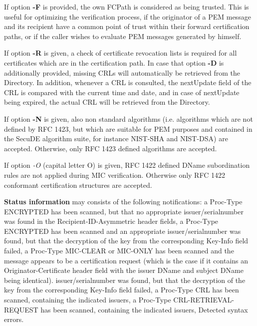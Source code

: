 If option {\bf -F} is provided, the own FCPath is considered as being trusted.
This is useful for optimizing the verification process,
if the originator of a PEM message and its recipient have a common point of trust
within their forward certification paths, or if the caller wishes to evaluate PEM messages
generated by himself.

If option {\bf -R} is given, a check of certificate revocation lists is required for all certificates
which are in the certification path. In case that option {\bf -D} is additionally provided, missing CRLs will
automatically be retrieved from the Directory. In addition, whenever a CRL is consulted, the 
nextUpdate field of the CRL is compared with the current time and date, and in case of nextUpdate
being expired, the actual CRL will be retrieved from the Directory. 

If option {\bf -N}
is given, also non standard algorithms (i.e. algorithms which are not defined by RFC 1423,
but which are suitable for PEM purposes and contained in the SecuDE algorithm suite, for instance
NIST-SHA and NIST-DSA) are accepted. Otherwise, only RFC 1423 defined algorithms are accepted.

If option {\em -O} (capital letter O) is given, RFC 1422 defined DName subordination rules
are not applied during MIC verification. Otherwise only RFC 1422 conformant certification
structures are accepted. 

{\bf Status information} may consists of the following notifications:
\bi
\m a Proc-Type ENCRYPTED has been scanned, but that no appropriate 
   issuer/serialnumber was found in the Recipient-ID-Asymmetric header fields,
\m a Proc-Type ENCRYPTED has been scanned and an appropriate 
   issuer/serialnumber was found, but that the decryption of the key from the corresponding 
   Key-Info field failed,
\m a Proc-Type MIC-CLEAR or MIC-ONLY has been scanned and the message appears to be a
   certification request (which is the case if it contains an Originator-Certificate
   header field with the issuer DName and subject DName being identical). 
   issuer/serialnumber was found, but that the decryption of the key from the corresponding 
   Key-Info field failed,
\m a Proc-Type CRL has been scanned, containing the indicated issuers,
\m a Proc-Type CRL-RETRIEVAL-REQUEST has been scanned, containing the indicated issuers,
\m Detected syntax errors.
\ei

